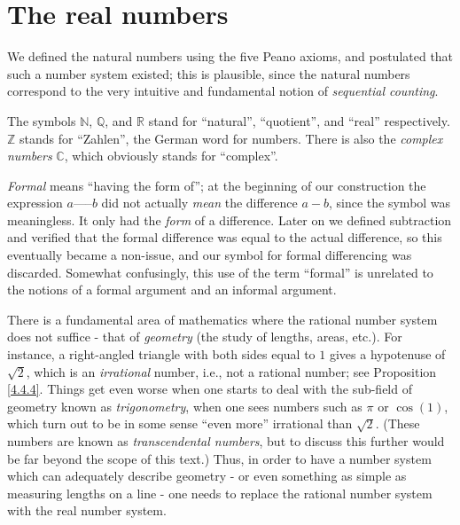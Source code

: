 \chapter{The real numbers}

\begin{note}
We defined the natural numbers using the five Peano axioms, and postulated that such a number system existed;
this is plausible, since the natural numbers correspond to the very intuitive and fundamental notion of \emph{sequential counting}.
\end{note}

\begin{note}
The symbols \(\mathds{N}\), \(\mathds{Q}\), and \(\mathds{R}\) stand for ``natural'', ``quotient'', and ``real'' respectively.
\(\mathds{Z}\) stands for ``Zahlen'', the German word for numbers.
There is also the \emph{complex numbers} \(\mathds{C}\), which obviously stands for ``complex''.
\end{note}

\begin{note}
\emph{Formal} means ``having the form of'';
at the beginning of our construction the expression \(a \text{-----} b\) did not actually \emph{mean} the difference \(a - b\), since the symbol \text{-----} was meaningless.
It only had the \emph{form} of a difference.
Later on we defined subtraction and verified that the formal difference was equal to the actual difference, so this eventually became a non-issue, and our symbol for formal differencing was discarded.
Somewhat confusingly, this use of the term ``formal'' is unrelated to the notions of a formal argument and an informal argument.
\end{note}

\begin{note}
There is a fundamental area of mathematics where the rational number system does not suffice - that of \emph{geometry}
(the study of lengths, areas, etc.).
For instance, a right-angled triangle with both sides equal to \(1\) gives a hypotenuse of \(\sqrt{2}\), which is an \emph{irrational} number, i.e., not a rational number;
see Proposition \ref{4.4.4}.
Things get even worse when one starts to deal with the sub-field of geometry known as \emph{trigonometry}, when one sees numbers such as \(\pi\) or \(\cos(1)\), which turn out to be in some sense ``even more'' irrational than \(\sqrt{2}\).
(These numbers are known as \emph{transcendental numbers}, but to discuss this further would be far beyond the scope of this text.)
Thus, in order to have a number system which can adequately describe geometry
- or even something as simple as measuring lengths on a line
- one needs to replace the rational number system with the real number system.
\end{note}

